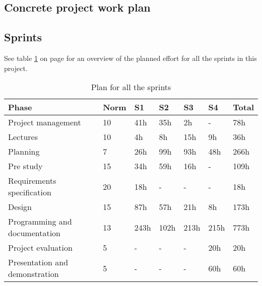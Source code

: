 

\subsection{Concrete project work plan}

\subsection*{Sprints}
See table \ref{tab:allsprints} on page \pageref{tab:allsprints} for an overview of the planned effort for all the sprints in this project.
\begin{table}[h!]
\begin{center}
\begin{tabular}{l|l|l|l|l|l|l} \hline
\textbf{Phase} &  \textbf{Norm} & \textbf{S1} & \textbf{S2}  & \textbf{S3} & \textbf{S4} & \textbf{Total} \\ \hline \hline
Project management & 10 & 41h & 35h & 2h & - & 78h\\
Lectures & 10 & 4h & 8h & 15h & 9h & 36h\\
Planning & 7 & 26h & 99h & 93h & 48h & 266h\\
Pre study & 15 & 34h & 59h & 16h & - & 109h\\
Requirements specification & 20 & 18h & - & - & - & 18h\\
Design & 15 & 87h & 57h & 21h & 8h & 173h\\
Programming and documentation & 13 & 243h & 102h & 213h & 215h & 773h\\
Project evaluation & 5 & - & - & - & 20h & 20h\\
Presentation and demonstration & 5 & - & - & - & 60h & 60h\\ \hline
\end{tabular}
\end{center}
\caption{Plan for all the sprints} \label{tab:allsprints}
\end{table}


